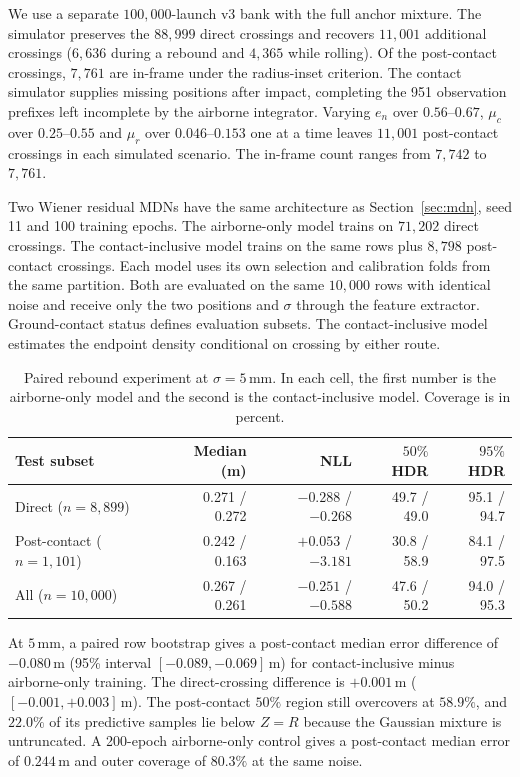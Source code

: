 \documentclass[11pt,a4paper]{article}
\begin{document}
We use a separate $100{,}000$-launch v3 bank with the full anchor mixture. The simulator preserves the $88{,}999$ direct crossings and recovers $11{,}001$ additional crossings ($6{,}636$ during a rebound and $4{,}365$ while rolling). Of the post-contact crossings, $7{,}761$ are in-frame under the radius-inset criterion. The contact simulator supplies missing positions after impact, completing the 951 observation prefixes left incomplete by the airborne integrator. Varying $e_n$ over $0.56$--$0.67$, $\mu_c$ over $0.25$--$0.55$ and $\mu_r$ over $0.046$--$0.153$ one at a time leaves $11{,}001$ post-contact crossings in each simulated scenario. The in-frame count ranges from $7{,}742$ to $7{,}761$.

Two Wiener residual MDNs have the same architecture as Section~\ref{sec:mdn}, seed 11 and 100 training epochs. The airborne-only model trains on $71{,}202$ direct crossings. The contact-inclusive model trains on the same rows plus $8{,}798$ post-contact crossings. Each model uses its own selection and calibration folds from the same partition. Both are evaluated on the same $10{,}000$ rows with identical noise and receive only the two positions and $\sigma$ through the feature extractor. Ground-contact status defines evaluation subsets. The contact-inclusive model estimates the endpoint density conditional on crossing by either route.

\begin{table}[htbp]
  \centering
  \small
  \caption{Paired rebound experiment at $\sigma=5\,\mathrm{mm}$. In each cell, the first number is the airborne-only model and the second is the contact-inclusive model. Coverage is in percent.}
  \label{tab:bounce}
  \begin{tabular}{lrrrr}
    \toprule
    Test subset & Median (m) & NLL & $50\%$ HDR & $95\%$ HDR \\
    \midrule
    Direct ($n=8{,}899$) & 0.271 / 0.272 & $-0.288$ / $-0.268$ & 49.7 / 49.0 & 95.1 / 94.7 \\
    Post-contact ($n=1{,}101$) & 0.242 / 0.163 & $+0.053$ / $-3.181$ & 30.8 / 58.9 & 84.1 / 97.5 \\
    All ($n=10{,}000$) & 0.267 / 0.261 & $-0.251$ / $-0.588$ & 47.6 / 50.2 & 94.0 / 95.3 \\
    \bottomrule
  \end{tabular}
\end{table}

At $5\,\mathrm{mm}$, a paired row bootstrap gives a post-contact median error difference of $-0.080\,\mathrm{m}$ (95\% interval $[-0.089,-0.069]\,\mathrm{m}$) for contact-inclusive minus airborne-only training. The direct-crossing difference is $+0.001\,\mathrm{m}$ ($[-0.001,+0.003]\,\mathrm{m}$). The post-contact $50\%$ region still overcovers at $58.9\%$, and $22.0\%$ of its predictive samples lie below $Z=R$ because the Gaussian mixture is untruncated. A 200-epoch airborne-only control gives a post-contact median error of $0.244\,\mathrm{m}$ and outer coverage of $80.3\%$ at the same noise.
\end{document}
